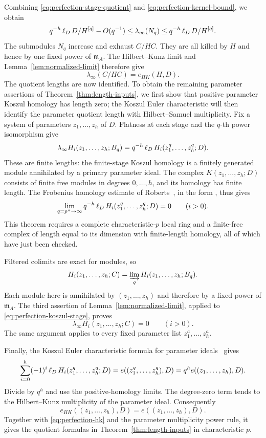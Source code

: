 Combining \eqref{eq:perfection-stage-quotient} and
\eqref{eq:perfection-kernel-bound}, we obtain
\[
 q^{-h}\operatorname{\ell}_D D/H^{[q]}-O(q^{-1})
 \leq\lambda_\infty(N_q)
 \leq q^{-h}\operatorname{\ell}_D D/H^{[q]}.
\]
The submodules $N_q$ increase and exhaust $C/HC$.  They are all killed
by $H$ and hence by one fixed power of $\mathfrak m_A$.  The
Hilbert--Kunz limit and Lemma~\ref{lem:normalized-limit} therefore give
\begin{equation}\label{eq:perfection-hk}
 \lambda_\infty(C/HC)=e_{HK}(H,D).
\end{equation}
The quotient lengths are now identified.  To obtain the remaining
parameter assertions of Theorem~\ref{thm:length-inputs}, we first show
that positive parameter Koszul homology has length zero; the Koszul
Euler characteristic will then identify the parameter quotient length
with Hilbert--Samuel multiplicity.  Fix a system of
parameters $z_1,\ldots,z_h$ of $D$.  Flatness at each stage and the
$q$-th power isomorphism give
\begin{equation}\label{eq:perfection-koszul-stage}
 \lambda_\infty H_i(z_1,\ldots,z_h;B_q)
   =q^{-h}\operatorname{\ell}_D H_i(z_1^q,\ldots,z_h^q;D).
\end{equation}
These are finite lengths: the finite-stage Koszul homology is a
finitely generated module annihilated by a primary parameter ideal.
The complex $K(z_1,\ldots,z_h;D)$ consists of finite free modules in
degrees $0,\ldots,h$, and its homology has finite length.  The
Frobenius homology estimate of Roberts~\cite{Roberts}, in the form
\cite[Theorem~2.4]{Ma}, thus gives
\[
 \lim_{q=p^n\to\infty}
 q^{-h}\operatorname{\ell}_D H_i(z_1^q,\ldots,z_h^q;D)=0
 \qquad(i>0).
\]
This theorem requires a complete characteristic-$p$ local ring and a
finite-free complex of length equal to its dimension with finite-length
homology, all of which have just been checked.

Filtered colimits are exact for modules, so
\[
 H_i(z_1,\ldots,z_h;C)
   =\varinjlim_q H_i(z_1,\ldots,z_h;B_q).
\]
Each module here is annihilated by $(z_1,\ldots,z_h)$ and therefore
by a fixed power of $\mathfrak m_A$.  The third assertion of
Lemma~\ref{lem:normalized-limit}, applied to
\eqref{eq:perfection-koszul-stage}, proves
\begin{equation}\label{eq:perfection-koszul-zero}
 \lambda_\infty H_i(z_1,\ldots,z_h;C)=0\qquad(i>0).
\end{equation}
The same argument applies to every fixed parameter list
$z_1^a,\ldots,z_h^a$.

Finally, the Koszul Euler characteristic formula for parameter
ideals~\cite[Tag~0AZZ]{Stacks} gives
\[
 \sum_{i=0}^h(-1)^i\operatorname{\ell}_D
             H_i(z_1^q,\ldots,z_h^q;D)
   =e((z_1^q,\ldots,z_h^q),D)
   =q^h e((z_1,\ldots,z_h),D).
\]
Divide by $q^h$ and use the positive-homology limits.  The degree-zero
term tends to the Hilbert--Kunz multiplicity of the parameter ideal.
Consequently
\[
 e_{HK}((z_1,\ldots,z_h),D)=e((z_1,\ldots,z_h),D).
\]
Together with \eqref{eq:perfection-hk} and the parameter multiplicity
power rule, it gives the quotient formulas in
Theorem~\ref{thm:length-inputs} in characteristic $p$.

